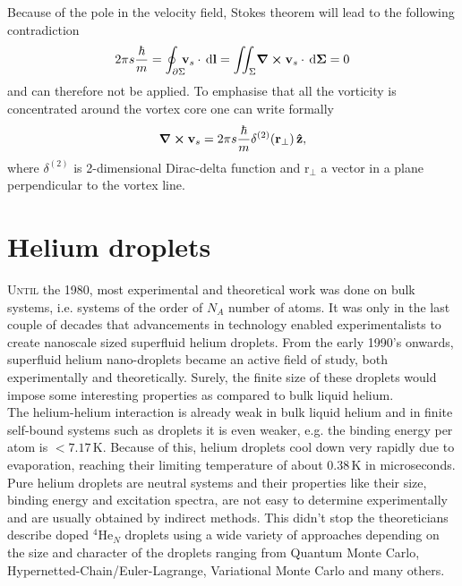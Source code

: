 \documentclass[12pt,a4paper,twosides]{book}
\renewcommand{\vec}[1]{\bm{\mathrm{#1}}}
\newcommand{\unit}[1]{\,\mathrm{#1}}
\begin{document}
			Because of the pole in the velocity field, Stokes theorem will lead to the following contradiction
			\begin{align}
				2\pi s\frac{\hbar}{m}=\oint_{\partial\Sigma}\!\!\!\vec{v}_s\cdot\unit{d}\vec{l} = \iint_{\Sigma}\!\curl{\vec{v}_s}\cdot\unit{d}\vec{\Sigma} = 0
			\end{align}
			and can therefore not be applied. To emphasise that all the vorticity is concentrated around the vortex core one can write formally
			\begin{align}
				\curl{\vec{v}_s} = 2\pi s\frac{\hbar}{m}\delta^{(2)}(\vec{r}_\perp)\,\vu{z},
			\end{align}
			where $\delta^{(2)}$ is 2-dimensional Dirac-delta function and $\vec{r}_\perp$ a vector in a plane perpendicular to the vortex line.\\

	\section{Helium droplets}
		\lettrine[lines=3,findent=3pt,nindent=0pt]{U}{ntil} the 1980, most experimental and theoretical work was done on bulk systems, i.e. systems of the order of $N_A$ number of atoms. It was only in the last couple of decades that advancements in technology enabled experimentalists to create nanoscale sized superfluid helium droplets. From the early 1990's onwards, superfluid helium nano-droplets became an active field of study, both experimentally and theoretically. Surely, the finite size of these droplets would impose some interesting properties as compared to bulk liquid helium.\\
		
		The helium-helium interaction is already weak in bulk liquid helium and in finite self-bound systems such as droplets it is even weaker, e.g. the binding energy per atom is $<\!7.17\unit{K}$. Because of this, helium droplets cool down very rapidly due to evaporation, reaching their limiting temperature of about $0.38\unit{K}$ in microseconds. Pure helium droplets are neutral systems and their properties like their size, binding energy and excitation spectra, are not easy to determine experimentally and are usually obtained by indirect methods. This didn't stop the theoreticians describe doped $^4$He$_N$ droplets using a wide variety of approaches depending on the size and character of the droplets ranging from Quantum Monte Carlo, Hypernetted-Chain/Euler-Lagrange, Variational Monte Carlo and many others.\\
	
\end{document}
